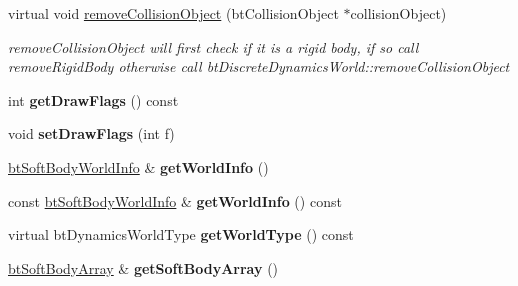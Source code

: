 \begin{DoxyCompactItemize}
\item 
\hypertarget{classbt_soft_rigid_dynamics_world_af2b8c217f386bb37cab6512294281c7e}{virtual void \hyperlink{classbt_soft_rigid_dynamics_world_af2b8c217f386bb37cab6512294281c7e}{remove\+Collision\+Object} (bt\+Collision\+Object $\ast$collision\+Object)}\label{classbt_soft_rigid_dynamics_world_af2b8c217f386bb37cab6512294281c7e}

\begin{DoxyCompactList}\small\item\em remove\+Collision\+Object will first check if it is a rigid body, if so call remove\+Rigid\+Body otherwise call bt\+Discrete\+Dynamics\+World\+::remove\+Collision\+Object \end{DoxyCompactList}\item 
\hypertarget{classbt_soft_rigid_dynamics_world_a71eb1e7164938e5964e84c3af465864f}{int {\bfseries get\+Draw\+Flags} () const }\label{classbt_soft_rigid_dynamics_world_a71eb1e7164938e5964e84c3af465864f}

\item 
\hypertarget{classbt_soft_rigid_dynamics_world_ad982fb770a12204e59a19dedeff32ae4}{void {\bfseries set\+Draw\+Flags} (int f)}\label{classbt_soft_rigid_dynamics_world_ad982fb770a12204e59a19dedeff32ae4}

\item 
\hypertarget{classbt_soft_rigid_dynamics_world_adf7ee702dee979e4120ce536eb95e695}{\hyperlink{structbt_soft_body_world_info}{bt\+Soft\+Body\+World\+Info} \& {\bfseries get\+World\+Info} ()}\label{classbt_soft_rigid_dynamics_world_adf7ee702dee979e4120ce536eb95e695}

\item 
\hypertarget{classbt_soft_rigid_dynamics_world_a57032ecdd44be4a10357bfdc0f1aab68}{const \hyperlink{structbt_soft_body_world_info}{bt\+Soft\+Body\+World\+Info} \& {\bfseries get\+World\+Info} () const }\label{classbt_soft_rigid_dynamics_world_a57032ecdd44be4a10357bfdc0f1aab68}

\item 
\hypertarget{classbt_soft_rigid_dynamics_world_ab1fefe17b8d0eafa9d6bcc350d84e540}{virtual bt\+Dynamics\+World\+Type {\bfseries get\+World\+Type} () const }\label{classbt_soft_rigid_dynamics_world_ab1fefe17b8d0eafa9d6bcc350d84e540}

\item 
\hypertarget{classbt_soft_rigid_dynamics_world_a4cf515c1e5bab7952f0a26c535aa7da8}{\hyperlink{classbt_aligned_object_array}{bt\+Soft\+Body\+Array} \& {\bfseries get\+Soft\+Body\+Array} ()}\label{classbt_soft_rigid_dynamics_world_a4cf515c1e5bab7952f0a26c535aa7da8}


\end{DoxyCompactItemize}

